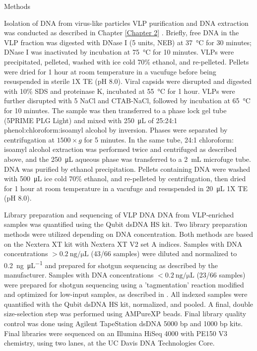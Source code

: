 \documentclass[oneside,12pt,final]{sty/ucthesis-CA2012}
\begin{document}
\begin{mainmatter}
\begin{section}{Methods}
\begin{subsection}{Isolation of DNA from virus-like particles}
VLP purification and DNA extraction was conducted as described in Chapter \ref{Chapter 2} \cite{RN41}. Briefly, free DNA in the VLP fraction was digested with DNase I (5 units, NEB) at \SI{37}{\celsius} for 30 minutes; DNase I was inactivated by incubation at \SI{75}{\celsius} for 10 minutes. VLPs were precipitated, pelleted, washed with ice cold 70\% ethanol, and re-pelleted. Pellets were dried for 1 hour at room temperature in a vacufuge before being resuspended in sterile 1X TE (pH 8.0). Viral capsids were disrupted and digested with 10\% SDS and proteinase K, incubated at \SI{55}{\celsius} for 1 hour. VLPs were further disrupted with \SI{5}{\molar} NaCl and CTAB-NaCl, followed by incubation at \SI{65}{\celsius} for 10 minutes. The sample was then transferred to a phase lock gel tube (5PRIME PLG Light) and mixed with \SI{250}{\micro\liter} of 25:24:1 phenol:chloroform:isoamyl alcohol by inversion. Phases were separated by centrifugation at $1500 \times g$ for 5 minutes. In the same tube, 24:1 chloroform: isoamyl alcohol extraction was performed twice and centrifuged as described above, and the \SI{250}{\micro\liter} aqueous phase was transferred to a \SI{2}{\mL} microfuge tube. DNA was purified by ethanol precipitation. Pellets containing DNA were washed with \SI{500}{\micro\liter} ice cold 70\% ethanol, and re-pelleted by centrifugation, then dried for 1 hour at room temperature in a vacufuge and resuspended in \SI{20}{\micro\liter} 1X TE (pH 8.0).
\end{subsection}

\begin{subsection}{Library preparation and sequencing of VLP DNA}
DNA from VLP-enriched samples was quantified using the Qubit dsDNA HS kit. Two library preparation methods were utilized depending on DNA concentration. Both methods are based on the Nextera XT kit with Nextera XT V2 set A indices. Samples with DNA concentrations $>\SI{0.2}{\nano\gram\per\micro\liter}$ (43/66 samples) were diluted and normalized to \SI{0.2}{\nano\gram\per\micro\liter} and prepared for shotgun sequencing as described by the manufacturer. Samples with DNA concentrations $<\SI{0.2}{\nano\gram\per\micro\liter}$ (23/66 samples) were prepared for shotgun sequencing using a 'tagmentation' reaction modified and optimized for low-input samples, as described in \cite{RN197}. All indexed samples were quantified with the Qubit dsDNA HS kit, normalized, and pooled. A final, double size-selection step was performed using AMPureXP beads. Final library quality control was done using Agilent TapeStation dsDNA 5000 bp and 1000 bp kits. Final libraries were sequenced on an Illumina HiSeq 4000 with PE150 V3 chemistry, using two lanes, at the UC Davis DNA Technologies Core. 
\end{subsection}


\end{section}
\end{mainmatter}
\end{document}
